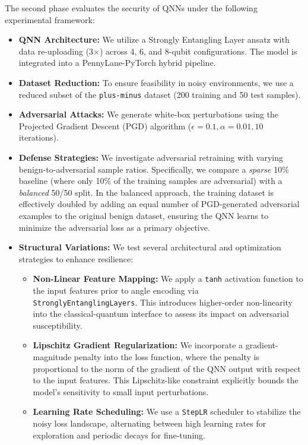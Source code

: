 The second phase evaluates the security of QNNs under the following experimental framework:

\begin{itemize}
    \item \textbf{QNN Architecture:} We utilize a Strongly Entangling Layer ansatz with data re-uploading (3×) across 4, 6, and 8-qubit configurations. The model is integrated into a PennyLane-PyTorch hybrid pipeline.
    \item \textbf{Dataset Reduction:} To ensure feasibility in noisy environments, we use a reduced subset of the \texttt{plus-minus} dataset (200 training and 50 test samples).
    \item \textbf{Adversarial Attacks:} We generate white-box perturbations using the Projected Gradient Descent (PGD) algorithm ($\epsilon=0.1, \alpha=0.01, 10$ iterations).
    \item \textbf{Defense Strategies:} We investigate adversarial retraining with varying benign-to-adversarial sample ratios. Specifically, we compare a \textit{sparse} 10\% baseline (where only 10\% of the training samples are adversarial) with a \textit{balanced} 50/50 split. In the balanced approach, the training dataset is effectively doubled by adding an equal number of PGD-generated adversarial examples to the original benign dataset, ensuring the QNN learns to minimize the adversarial loss as a primary objective.
    \item \textbf{Structural Variations:} We test several architectural and optimization strategies to enhance resilience:
    \begin{itemize}
        \item \textbf{Non-Linear Feature Mapping:} We apply a \texttt{tanh} activation function to the input features prior to angle encoding via \texttt{StronglyEntanglingLayers}. This introduces higher-order non-linearity into the classical-quantum interface to assess its impact on adversarial susceptibility.
        \item \textbf{Lipschitz Gradient Regularization:} We incorporate a gradient-magnitude penalty into the loss function, where the penalty is proportional to the norm of the gradient of the QNN output with respect to the input features. This Lipschitz-like constraint explicitly bounds the model's sensitivity to small input perturbations.
        \item \textbf{Learning Rate Scheduling:} We use a \texttt{StepLR} scheduler to stabilize the noisy loss landscape, alternating between high learning rates for exploration and periodic decays for fine-tuning.
    \end{itemize}
\end{itemize}

